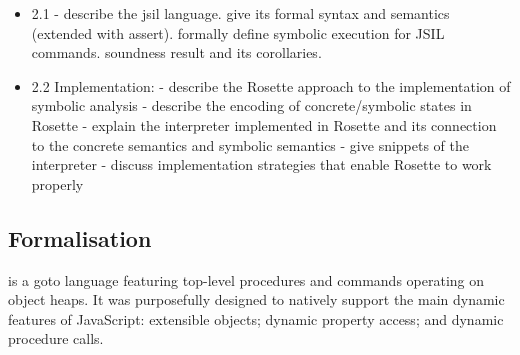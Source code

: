 
\begin{itemize}
 
  \item 2.1 - describe the jsil language. give its formal syntax  and semantics (extended with assert). 
                   formally define symbolic execution for JSIL commands. soundness result and its corollaries.  
 
  \item 2.2 Implementation:  
               - describe the Rosette approach to the implementation of symbolic analysis 
               - describe the encoding of \jsil concrete/symbolic states in Rosette 
               - explain the \jsil interpreter implemented in Rosette and its connection to the \jsil concrete semantics  and symbolic semantics 
               		- give snippets of the interpreter 
	       		- discuss implementation strategies that enable Rosette to work properly
\end{itemize}

\subsection{Formalisation}

 \jsil is a goto language featuring top-level procedures and commands operating on object heaps. It was purposefully designed to natively support the main dynamic features of JavaScript: extensible objects; dynamic property access; and dynamic procedure calls. 

 
